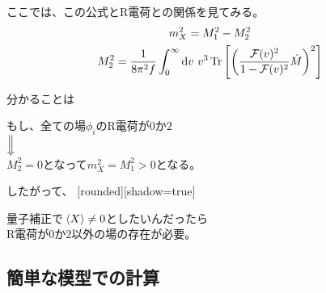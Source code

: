 \documentclass[
  unicode,a4paper,9pt,
  xcolor = {dvipsnames,svgnames},
  hyperref ={colorlinks=true,citecolor=Navy,linkcolor=NavyBlue,urlcolor=purple},
  ja=standard,lualatex
]{beamer}
\begin{document}
\begin{frame}
  \frametitle{\subsecname}

  ここでは、この公式とR電荷との関係を見てみる。
  \begin{gather}
    m_{X}^2=M_{1}^2-M_{2}^2
    \nonumber
    \\
    M_{2}^2
    =
    \frac{1}{8\pi^2 f}\int_{0}^{\infty}\dd v\ 
    v^3\Tr\left[ \left( \frac{\mathcal{F}(v)^2}{1-\mathcal{F}(v)^2}\hat{M}  \right)^2 \right]
    \nonumber
  \end{gather}

  分かることは
  \begin{center}
    もし、全ての場$\phi_{i}$のR電荷が$0$か$2$ \\
    ${\Big \Downarrow}$ \\
    $M_{2}^2=0$となって$m_{X}^2=M_{1}^2>0$となる。
  \end{center}

  したがって、
  [rounded][shadow=true]
  \begin{block}{}
    \centering
    量子補正で$\ev*{X}\neq 0$としたいんだったら \\
    R電荷が$0$か$2$以外の場の存在が必要。
  \end{block}

\end{frame}


\begin{frame}



  

\end{frame}


\subsection{簡単な模型での計算}
\end{document}
